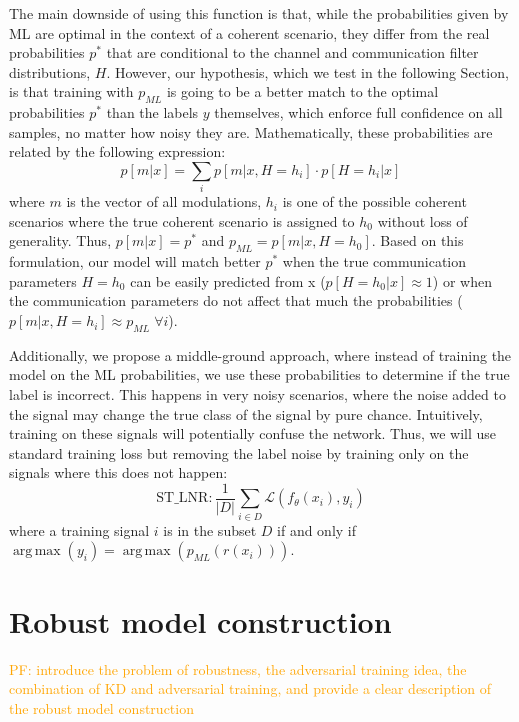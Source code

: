 \documentclass[conference]{IEEEtran}
\newcommand{\pf}[1]{{\textcolor{orange}{PF: {#1}}}}
\newcommand{\Ls}{\mathcal{L}}
\DeclareMathOperator*{\argmax}{arg\,max}
\begin{document}
The main downside of using this function is that, while the probabilities given by ML are optimal in the context of a coherent scenario, they differ from the real probabilities $p^{*}$ that are conditional to the channel and communication filter distributions, $H$. However, our hypothesis, which we test in the following Section, is that training with $p_{ML}$ is going to be a better match to the optimal probabilities $p^{*}$ than the labels $y$ themselves, which enforce full confidence on all samples, no matter how noisy they are. Mathematically, these probabilities are related by the following expression:
\begin{equation}
	p[m|x] =  \sum_i p[m|x,H=h_i] \cdot p[H=h_i|x]
\end{equation}
where $m$ is the vector of all modulations, $h_i$ is one of the possible coherent scenarios where the true coherent scenario is assigned to $h_0$ without loss of generality. Thus, $p[m|x] = p^{*}$ and $p_{ML} = p[m|x,H=h_0]$. Based on this formulation, our model will match better $p^{*}$ when the true communication parameters $H=h_0$ can be easily predicted from x ($p[H=h_0|x] \approx 1$) or when the communication parameters do not affect that much the probabilities ($p[m|x,H=h_i] \approx p_{ML} \; \forall i$).

Additionally, we propose a middle-ground approach, where instead of training the model on the ML probabilities, we use these probabilities to determine if the true label is incorrect. This happens in very noisy scenarios, where the noise added to the signal may change the true class of the signal by pure chance. Intuitively, training on these signals will potentially confuse the network. Thus, we will use standard training loss but removing the label noise by training only on the signals where this does not happen:
\begin{equation}
    \text{ST\_LNR} : \dfrac{1}{|D|}\sum_{i \in D}\Ls(f_{\theta}(x_i), y_i)
\end{equation}
where a training signal $i$ is in the subset $D$ if and only if $\argmax(y_i) = \argmax(p_{ML}(r(x_i)))$.


\section{Robust model construction}

\pf{introduce the problem of robustness, the adversarial training idea, the combination of KD and adversarial training, and provide a clear description of the robust model construction}
\end{document}
